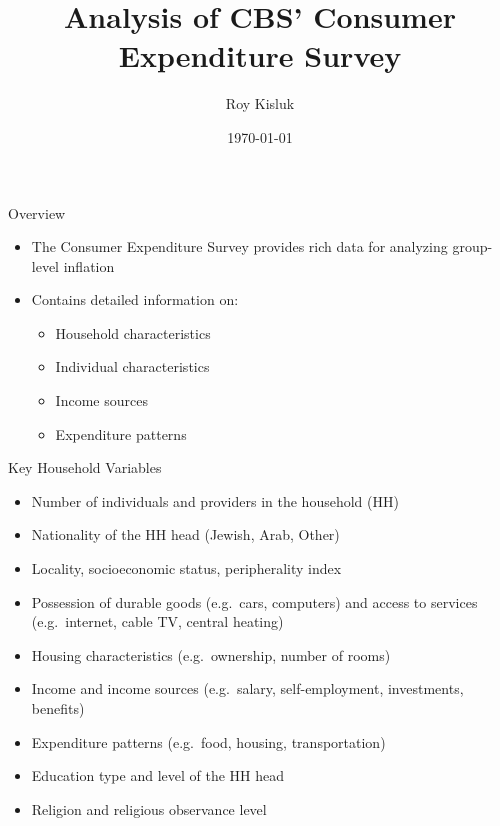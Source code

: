 \documentclass{beamer}
\title{Analysis of CBS' Consumer Expenditure Survey}
\author{Roy Kisluk}
\date{\today}
\begin{document}
\begin{frame}
    \titlepage
\end{frame}

\begin{frame}{Overview}
    \begin{itemize}
        \item The Consumer Expenditure Survey provides rich data for analyzing group-level inflation
        \item Contains detailed information on:
              \begin{itemize}
                  \item Household characteristics
                  \item Individual characteristics
                  \item Income sources
                  \item Expenditure patterns
              \end{itemize}
    \end{itemize}
\end{frame}

\begin{frame}{Key Household Variables}
    \begin{itemize}
        \item Number of individuals and providers in the household (HH)
        \item Nationality of the HH head (Jewish, Arab, Other)
        \item Locality, socioeconomic status, peripherality index
        \item Possession of durable goods (e.g.\ cars, computers) and access to services (e.g.\ internet, cable TV, central heating)
        \item Housing characteristics (e.g.\ ownership, number of rooms)
        \item Income and income sources (e.g.\ salary, self-employment, investments, benefits)
        \item Expenditure patterns (e.g.\ food, housing, transportation)
        \item Education type and level of the HH head
        \item Religion and religious observance level
    \end{itemize}
\end{frame}
\end{document}
